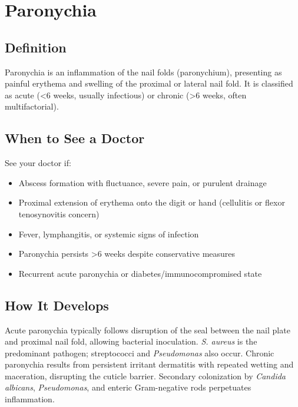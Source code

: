 \chapter{Paronychia}

\section*{Definition}
Paronychia is an inflammation of the nail folds (paronychium), presenting as painful erythema and swelling of the proximal or lateral nail fold. It is classified as acute (<6 weeks, usually infectious) or chronic (>6 weeks, often multifactorial).

\section*{When to See a Doctor}
See your doctor if:
\begin{itemize}
  \item Abscess formation with fluctuance, severe pain, or purulent drainage
  \item Proximal extension of erythema onto the digit or hand (cellulitis or flexor tenosynovitis concern)
  \item Fever, lymphangitis, or systemic signs of infection
  \item Paronychia persists >6 weeks despite conservative measures
  \item Recurrent acute paronychia or diabetes/immunocompromised state
\end{itemize}

\section*{How It Develops}
Acute paronychia typically follows disruption of the seal between the nail plate and proximal nail fold, allowing bacterial inoculation. \textit{S. aureus} is the predominant pathogen; streptococci and \textit{Pseudomonas} also occur. Chronic paronychia results from persistent irritant dermatitis with repeated wetting and maceration, disrupting the cuticle barrier. Secondary colonization by \textit{Candida albicans}, \textit{Pseudomonas}, and enteric Gram-negative rods perpetuates inflammation.


